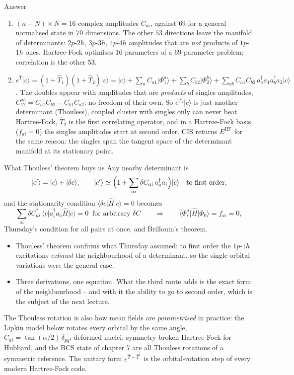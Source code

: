 \documentclass[aspectratio=169,10pt]{beamer}
\newcounter{thinkctr}
\newcommand{\thinka}[1]{%
  \begin{tcolorbox}[colback=paleteal,colframe=teal,title={\bfseries Answer to pause \#\thethinkctr}]
  #1
  \end{tcolorbox}}
\newcommand{\mbbox}[1]{%
  \begin{tcolorbox}[colback=paleblue,colframe=uioblue,title={\bfseries Many-body connection}]
  #1
  \end{tcolorbox}}
\newcommand{\ket}[1]{\vert #1\rangle}
\newcommand{\element}[3]{\langle #1\vert #2\vert #3\rangle}
\begin{document}
\begin{frame}{Answer}
  \thinka{
  \begin{enumerate}
    \item $(n-N)\times N=16$ complex amplitudes $C_{ai}$, against $69$ for a general normalised state in $70$ dimensions. The other $53$ directions leave the manifold of determinants: $2p$-$2h$, $3p$-$3h$, $4p$-$4h$ amplitudes that are \emph{not} products of $1p$-$1h$ ones. Hartree-Fock optimises $16$ parameters of a $69$-parameter problem; correlation is the other $53$.
    \item $e^{\hat{T}}\ket{c}=(1+\hat{T}_1)(1+\hat{T}_2)\ket{c}=\ket{c}+\sum_aC_{a1}\ket{\Phi_1^a}+\sum_bC_{b2}\ket{\Phi_2^b}+\sum_{ab}C_{a1}C_{b2}\,a_a^{\dagger}a_1a_b^{\dagger}a_2\ket{c}$. The doubles appear with amplitudes that are \emph{products} of singles amplitudes, $C_{12}^{ab}=C_{a1}C_{b2}-C_{b1}C_{a2}$: no freedom of their own. So $e^{\hat{T}_1}\ket{c}$ is just another determinant (Thouless), coupled cluster with singles only can never beat Hartree-Fock, $\hat{T}_2$ is the first correlating operator, and in a Hartree-Fock basis ($f_{ai}=0$) the singles amplitudes start at second order. CIS returns $E^{\mathrm{HF}}$ for the same reason: the singles span the tangent space of the determinant manifold at its stationary point.
  \end{enumerate}}
\end{frame}

\begin{frame}{What Thouless' theorem buys us}
  \footnotesize
  Any nearby determinant is
  \[
    \ket{c'}=\ket{c}+\ket{\delta c},\qquad\ket{c'}\simeq\Bigl(1+\sum_{ai}\delta C_{ai}\,a_a^{\dagger}a_i\Bigr)\ket{c}\quad\text{to first order},
  \]
  and the stationarity condition $\element{\delta c}{\hat{H}}{c}=0$ becomes
  \[
    \sum_{ai}\delta C_{ai}^{*}\,\element{c}{a_i^{\dagger}a_a\hat{H}}{c}=0\ \text{ for arbitrary }\delta C
    \qquad\Longrightarrow\qquad
    \element{\Phi_i^a}{\hat{H}}{\Phi_0}=f_{ai}=0 ,
  \]
  Thursday's condition for all pairs at once, and Brillouin's theorem.
  \begin{itemize}
    \item Thouless' theorem confirms what Thursday assumed: to first order the $1p$-$1h$ excitations \emph{exhaust} the neighbourhood of a determinant, so the single-orbital variations were the general case.
    \item Three derivations, one equation. What the third route adds is the \alert{exact} form of the neighbourhood -- and with it the ability to go to second order, which is the subject of the next lecture.
  \end{itemize}
  \mbbox{The Thouless rotation is also how mean fields are \emph{parametrised} in practice: the Lipkin model below rotates every orbital by the same angle, $C_{ai}=\tan(\alpha/2)\,\delta_{pq}$; deformed nuclei, symmetry-broken Hartree-Fock for Hubbard, and the BCS state of chapter 7 are all Thouless rotations of a symmetric reference. The unitary form $e^{\hat{T}-\hat{T}^{\dagger}}$ is the orbital-rotation step of every modern Hartree-Fock code.}
\end{frame}
\end{document}
